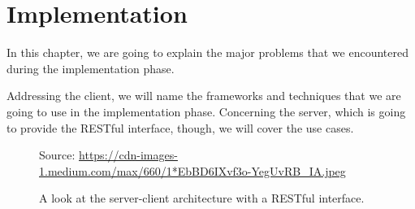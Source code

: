 \chapter{Implementation}
\label{Implementation}

In this chapter, we are going to explain the major problems that we encountered during the implementation phase.

Addressing the client, we will name the frameworks and techniques that we are going to use in the implementation phase. Concerning the server, which is going to provide the RESTful interface, though, we will cover the use cases.

\begin{figure}[!htb]
    \begin{center}
    \setlength{\fboxsep}{4pt}%
    \setlength{\fboxrule}{1pt}%
    {\scriptsize%
     Source: \url{https://cdn-images-1.medium.com/max/660/1*EbBD6IXvf3o-YegUvRB_IA.jpeg}}
    \caption {A look at the server-client architecture with a RESTful interface.}
    \label{fig:design1}
\end{center}
\end{figure}
